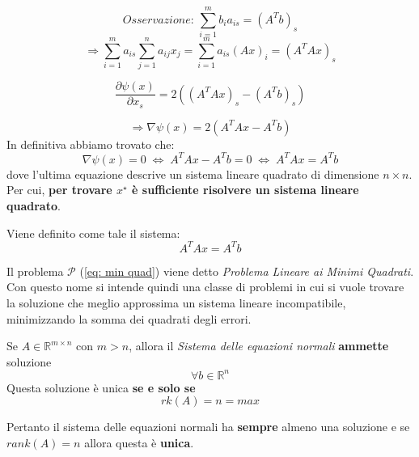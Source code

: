 \documentclass[12pt,a4paper,]{report}
\begin{document}
\[
\textit{Osservazione: } \sum_{i=1}^{m} b_i a_{is} = (A^T b)_s
\]
\[
\Rightarrow \sum_{i=1}^{m} a_{is} \sum_{j=1}^{n} a_{ij} x_j
= \sum_{i=1}^{m} a_{is} (A x)_i
= (A^T A x)_s
\]

\[
\frac{\partial \psi(x)}{\partial x_s}
= 2 \left( (A^T A x)_s - (A^T b)_s \right)
\]

\[
\Rightarrow \nabla \psi(x) = 2 (A^T A x - A^T b)
\]
In definitiva abbiamo trovato che:
\[
\nabla \psi(x) = 0
\;\Longleftrightarrow\;
A^T A x - A^T b = 0
\;\Longleftrightarrow\;
A^T A x = A^T b
\]
dove l'ultima equazione descrive un sistema lineare quadrato di dimensione $n \times n$.\\
Per cui, \textbf{per trovare $x^\star$ \`e sufficiente risolvere
un sistema lineare quadrato}.

\begin{definizione}
    \label{def: eq normali}
    Viene definito come tale il sistema:
    \[
    A^TAx=A^Tb
    \]
\end{definizione}
\begin{definizione}
    Il problema $\mathcal{P}$ (\ref{eq: min quad}) viene detto \textit{Problema Lineare ai Minimi Quadrati}.
    Con questo nome si intende quindi una classe di problemi in cui si vuole trovare la soluzione che meglio approssima un sistema lineare incompatibile, minimizzando la somma dei quadrati degli errori.
\end{definizione}

\begin{teorema}
    Se $A\in \mathbb{R}^{m\times n}$ con $m>n$, allora il \textit{Sistema delle equazioni normali} \textbf{ammette} soluzione \[\forall b \in \mathbb{R}^n\] 
    Questa soluzione è unica \textbf{se e solo se} 
    \[
    rk(A)=n=max
    \]
\end{teorema}
Pertanto il sistema delle equazioni normali ha \textbf{sempre} almeno una soluzione e se $rank(A) = n$ allora questa è \textbf{unica}.
\end{document}
